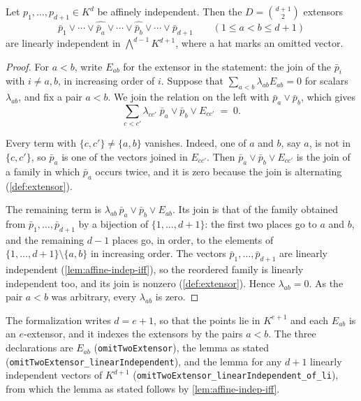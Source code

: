\begin{lemma}
  \label{lem:extensor-independence}
  \leanok
  Let $p_1, \dots, p_{d+1} \in K^{d}$ be affinely independent. Then the
  $D = \binom{d+1}{2}$ extensors
  \[
    \bar p_1 \vee \cdots \vee \widehat{\bar p_a} \vee \cdots
      \vee \widehat{\bar p_b} \vee \cdots \vee \bar p_{d+1}
    \qquad (1 \le a < b \le d+1)
  \]
  are linearly independent in $\bigwedge^{d-1} K^{d+1}$, where a hat
  marks an omitted vector.
\end{lemma}
\begin{proof}
  \leanok
  For $a < b$, write $E_{ab}$ for the extensor in the statement: the
  join of the $\bar p_i$ with $i \neq a, b$, in increasing order of
  $i$. Suppose that $\sum_{a < b} \lambda_{ab} E_{ab} = 0$ for scalars
  $\lambda_{ab}$, and fix a pair $a < b$. We join the relation on the
  left with $\bar p_a \vee \bar p_b$, which gives
  \[
    \sum_{c < c'} \lambda_{cc'}\; \bar p_a \vee \bar p_b \vee E_{cc'}
    \;=\; 0 .
  \]

  Every term with $\{c, c'\} \neq \{a, b\}$ vanishes. Indeed, one of
  $a$ and $b$, say $a$, is not in $\{c, c'\}$, so $\bar p_a$ is one of
  the vectors joined in $E_{cc'}$. Then
  $\bar p_a \vee \bar p_b \vee E_{cc'}$ is the join of a family in
  which $\bar p_a$ occurs twice, and it is zero because the join is
  alternating (\cref{def:extensor}).

  The remaining term is
  $\lambda_{ab}\, \bar p_a \vee \bar p_b \vee E_{ab}$. Its join is that
  of the family obtained from $\bar p_1, \dots, \bar p_{d+1}$ by a
  bijection of $\{1, \dots, d+1\}$: the first two places go to $a$ and
  $b$, and the remaining $d-1$ places go, in order, to the elements of
  $\{1, \dots, d+1\} \setminus \{a, b\}$ in increasing order. The
  vectors $\bar p_1, \dots, \bar p_{d+1}$ are linearly independent
  (\cref{lem:affine-indep-iff}), so the reordered family is linearly
  independent too, and its join is nonzero (\cref{def:extensor}).
  Hence $\lambda_{ab} = 0$. As the pair $a < b$ was arbitrary, every
  $\lambda_{ab}$ is zero.
\end{proof}
\begin{fmlnote}
  The formalization writes $d = e + 1$, so that the points lie in
  $K^{e+1}$ and each $E_{ab}$ is an $e$-extensor, and it indexes the
  extensors by the pairs $a < b$. The three declarations are $E_{ab}$
  (\texttt{omitTwoExtensor}), the lemma as stated
  (\texttt{omitTwoExtensor\_\allowbreak{}linearIndependent}), and the
  lemma for any $d+1$ linearly independent vectors of $K^{d+1}$
  (\texttt{omitTwoExtensor\_\allowbreak{}linearIndependent\_\allowbreak{}of\_\allowbreak{}li}),
  from which the lemma as stated follows by \cref{lem:affine-indep-iff}.
\end{fmlnote}

